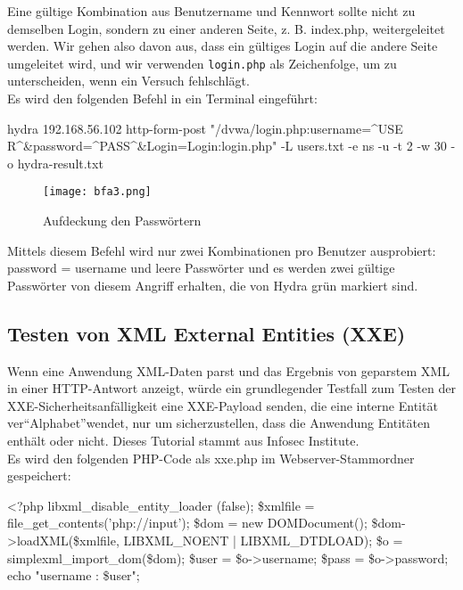 Eine gültige Kombination aus Benutzername und Kennwort sollte nicht zu demselben Login, sondern zu einer anderen Seite, z. B. index.php, weitergeleitet werden. Wir gehen also davon aus, dass ein gültiges Login auf die andere Seite umgeleitet wird, und wir verwenden \texttt{login.php} als Zeichenfolge, um zu unterscheiden, wenn ein Versuch fehlschlägt\cite[145]{najera2016kali}.\\

Es wird den folgenden Befehl in ein Terminal eingeführt\cite[145]{najera2016kali}:

\begin{LaTeXCode}[caption={Befehl durch Terminal},captionpos=b, label=LaTeXCode:beheldt1][numbers=none]
hydra 192.168.56.102 http-form-post "/dvwa/login.php:username=^USE
R^&password=^PASS^&Login=Login:login.php" -L users.txt -e ns -u -t 2 -w 30 -o hydra-result.txt
\end{LaTeXCode}

\begin{figure}[h]
	\centering
	\texttt{[image: bfa3.png]}
	\caption{Aufdeckung den Passwörtern}
\end{figure}

Mittels diesem Befehl wird nur zwei Kombinationen pro Benutzer ausprobiert: password = username und leere Passwörter und es werden zwei gültige Passwörter von diesem Angriff erhalten, die von Hydra grün markiert sind\cite[145]{najera2016kali}.

\subsection{Testen von XML External Entities (XXE)}

Wenn eine Anwendung XML-Daten parst und das Ergebnis von geparstem XML in einer HTTP-Antwort anzeigt, würde ein grundlegender Testfall zum Testen der XXE-Sicherheitsanfälligkeit eine XXE-Payload senden, die eine interne Entität ver"`Alphabet"'wendet, nur um sicherzustellen, dass die Anwendung Entitäten enthält oder nicht. Dieses Tutorial stammt aus Infosec Institute\cite{infosec18}.\\

Es wird den folgenden PHP-Code als xxe.php im Webserver-Stammordner gespeichert:

\newpage

\begin{LaTeXCode}[caption={XXE PHP-Datei},captionpos=b][numbers=none]
<?php
libxml_disable_entity_loader (false);
\$xmlfile = file_get_contents('php://input');
\$dom = new DOMDocument();
\$dom->loadXML(\$xmlfile, LIBXML_NOENT | LIBXML_DTDLOAD);
\$o = simplexml_import_dom(\$dom);
\$user = \$o->username;
\$pass = \$o->password;
echo "username : \$user";\\
\end{LaTeXCode}

